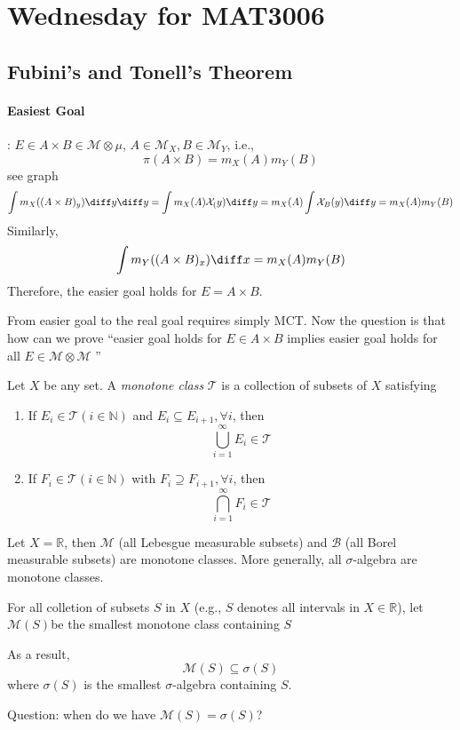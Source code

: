 
\section{Wednesday for MAT3006}
\subsection{Fubini's and Tonell's Theorem}


\paragraph{Easiest Goal}:
$E\in A\times B\in\mathcal{M}\otimes\mu$, $A\in\mathcal{M}_X,B\in\mathcal{M}_Y$, i.e.,
\[
\pi(A\times B) = m_X(A)m_Y(B)
\]
see graph
\[
\int m_X((A\times B)_y)\diff y \diff y = \int m_X(A)\mathcal{X}_(y)\diff y=m_X(A)\int\mathcal{X}_B(y)\diff y=
m_X(A)m_Y(B)
\]
Similarly,
\[
\int m_Y((A\times B)_x)\diff x = m_X(A)m_Y(B)
\]
Therefore, the easier goal holds for $E=A\times B$.

From easier goal to the real goal requires simply MCT.
Now  the question is that how can we prove ``easier goal holds for $E\in A\times B$ implies easier goal holds for all $E\in\mathcal{M}\otimes\mathcal{M}$ ''

\begin{definition}
Let $X$ be any set. A \emph{monotone class} $\mathcal{T}$ is a collection of subsets of $X$ satisfying 
\begin{enumerate}
\item
If $E_i\in\mathcal{T} (i\in\mathbb{N})$ and $E_i\subseteq E_{i+1},\forall i$, then
\[
\bigcup_{i=1}^\infty E_i\in\mathcal{T}
\]
\item
If $F_i\in\mathcal{T} (i\in\mathbb{N})$ with $F_i\supseteq F_{i+1},\forall i$, then
\[
\bigcap_{i=1}^\infty F_i\in\mathcal{T}
\]
\end{enumerate}
\end{definition}


\begin{example}
Let $X=\mathbb{R}$, then $\mathcal{M}$ (all Lebesgue measurable subsets) and $\mathcal{B}$ (all Borel measurable subsets) are monotone classes.
More generally, all $\sigma$-algebra are monotone classes.
\end{example}

\begin{definition}
For all colletion of subsets $S$ in $X$ (e.g., $S$ denotes all intervals in $X\in\mathbb{R}$),
let $\mathcal{M}(S)$be the smallest monotone class containing $S$
\end{definition}
\begin{remark}
As a result,
\[
\mathcal{M}(S)\subseteq\sigma(S)
\]
where $\sigma(S)$ is the smallest $\sigma$-algebra containing $S$.

Question: when do we have $\mathcal{M}(S)=\sigma(S)$?
\end{remark}

